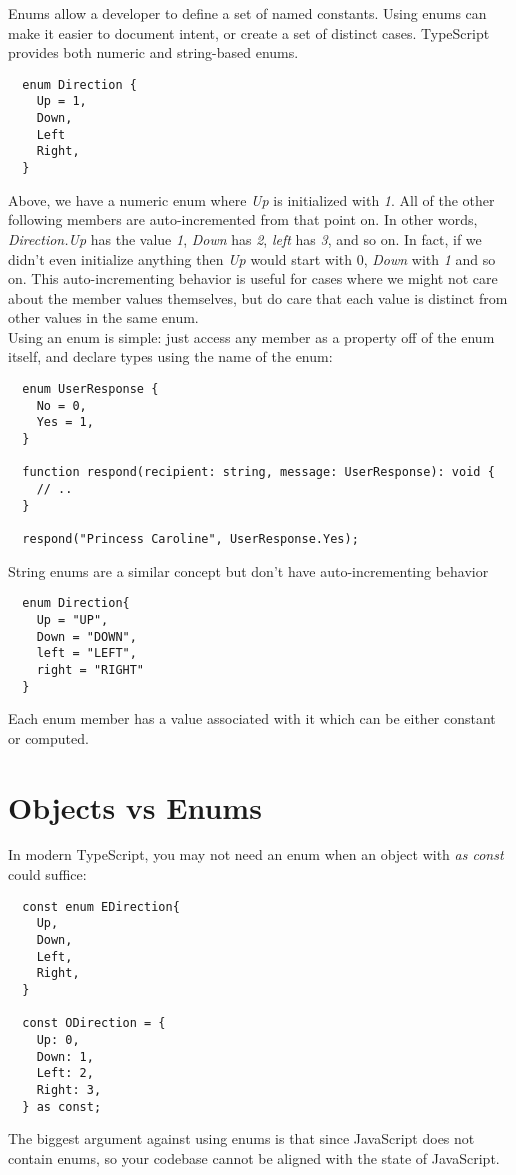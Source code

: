 \documentclass{article}%
\begin{document}
Enums allow a developer to define a set of named constants. Using enums can make it easier to document intent, or create a set of distinct cases. TypeScript provides both numeric and string-based enums.

\begin{lstlisting}
  enum Direction {
    Up = 1,
    Down,
    Left
    Right,
  }
\end{lstlisting}
Above, we have a numeric enum where \textit{Up} is initialized with \textit{1}. All of the other following members are auto-incremented from that point on. In other words, 
\textit{Direction.Up} has the value \textit{1}, \textit{Down} has \textit{2}, \textit{left} has \textit{3}, and so on. In fact, if we didn't even initialize anything then \textit{Up} would start with 0, \textit{Down} with \textit{1} and so on.
This auto-incrementing behavior is useful for cases where we might not care about the member values themselves, but do care that each value is distinct from other values in the same enum. \\

Using an enum is simple: just access any member as a property off of the enum itself, and declare types using the name of the enum:

\begin{lstlisting}
  enum UserResponse {
    No = 0,
    Yes = 1,
  }

  function respond(recipient: string, message: UserResponse): void {
    // ..
  }

  respond("Princess Caroline", UserResponse.Yes);
\end{lstlisting}

String enums are a similar concept but don't have auto-incrementing behavior
\begin{lstlisting}
  enum Direction{
    Up = "UP",
    Down = "DOWN",
    left = "LEFT",
    right = "RIGHT"
  }
\end{lstlisting}
Each enum member has a value associated with it which can be either constant or computed.

\section{Objects vs Enums}
In modern TypeScript, you may not need an enum when an object with \textit{as const} could suffice:
\begin{lstlisting}
  const enum EDirection{
    Up,
    Down,
    Left,
    Right,
  }

  const ODirection = {
    Up: 0,
    Down: 1,
    Left: 2,
    Right: 3,
  } as const;

\end{lstlisting}

The biggest argument against using enums is that since JavaScript does not contain enums, so your codebase cannot be aligned
with the state of JavaScript.
\end{document}
